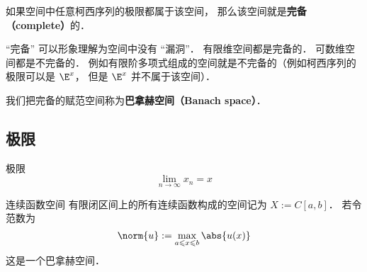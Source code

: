 

如果空间中任意柯西序列的极限都属于该空间， 那么该空间就是\textbf{完备（complete）}的．

“完备” 可以形象理解为空间中没有 “漏洞”． 有限维空间都是完备的． 可数维空间都是不完备的． 例如有限阶多项式组成的空间就是不完备的（例如柯西序列的极限可以是 $\E^x$， 但是 $\E^x$ 并不属于该空间）．

我们把完备的赋范空间称为\textbf{巴拿赫空间（Banach space）}．

\subsection{极限}
极限
\begin{equation}
\lim_{n\to\infty} x_n = x
\end{equation}


\begin{example}{连续函数空间}
有限闭区间上的所有连续函数构成的空间记为 $X := C[a, b]$． 若令范数为
\begin{equation}
\norm{u} := \max_{a \leqslant x \leqslant b} \abs{u(x)}
\end{equation}
这是一个巴拿赫空间．
\end{example}

